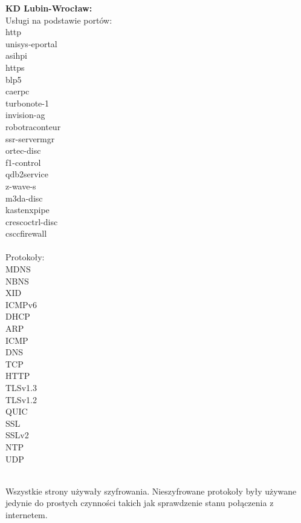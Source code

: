 \documentclass[12pt,a4paper]{article}
\begin{document}
\begin{multicols}{2}
\begin{center}
                \textbf{KD Lubin-Wrocław:}\\
                Usługi na podstawie portów:\\
                http\\
                unisys-eportal\\
                asihpi\\
                https\\
                blp5\\
                caerpc\\
                turbonote-1\\
                invision-ag\\
                robotraconteur\\
                ssr-servermgr\\
                ortec-disc\\
                f1-control\\
                qdb2service\\
                z-wave-s\\
                m3da-disc\\
                kastenxpipe\\
                crescoctrl-disc\\
                csccfirewall\\~\\
                
                Protokoły:\\
                MDNS\\
                NBNS\\
                XID\\
                ICMPv6\\
                DHCP\\
                ARP\\
                ICMP\\
                DNS\\
                TCP\\
                HTTP\\
                TLSv1.3\\
                TLSv1.2\\
                QUIC\\
                SSL\\
                SSLv2\\
                NTP\\
                UDP\\
            \end{center}
        \end{multicols}
        ~\\
        Wszystkie strony używały szyfrowania. Nieszyfrowane protokoły były używane jedynie do prostych czynności takich jak sprawdzenie stanu połączenia z internetem.
\end{document}

